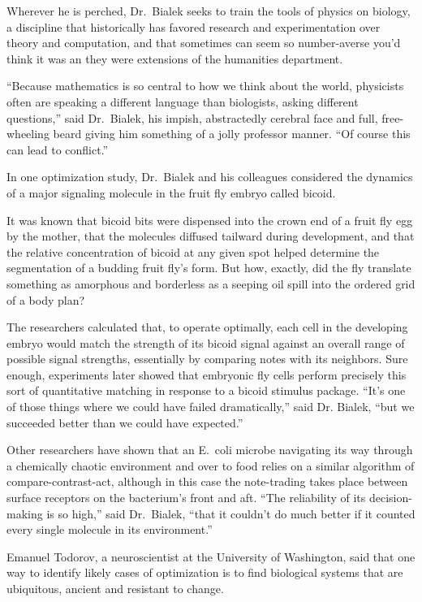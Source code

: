 ﻿\documentclass[12pt]{article}
\begin{document}
Wherever he is perched, Dr.~Bialek seeks to train the tools of physics on biology, a discipline that
historically has favored research and experimentation over theory and computation, and that
sometimes can seem so number-averse you'd think it was an they were extensions of the humanities
department.

``Because mathematics is so central to how we think about the world, physicists often are speaking a
different language than biologists, asking different questions,'' said Dr.~Bialek, his impish,
abstractedly cerebral face and full, free-wheeling beard giving him something of a jolly professor
manner. ``Of course this can lead to conflict.''

In one optimization study, Dr.~Bialek and his colleagues considered the dynamics of a major
signaling molecule in the fruit fly embryo called bicoid.

It was known that bicoid bits were dispensed into the crown end of a fruit fly egg by the mother,
that the molecules diffused tailward during development, and that the relative concentration of
bicoid at any given spot helped determine the segmentation of a budding fruit fly's form. But how,
exactly, did the fly translate something as amorphous and borderless as a seeping oil spill into the
ordered grid of a body plan?

The researchers calculated that, to operate optimally, each cell in the developing embryo would
match the strength of its bicoid signal against an overall range of possible signal strengths,
essentially by comparing notes with its neighbors. Sure enough, experiments later showed that
embryonic fly cells perform precisely this sort of quantitative matching in response to a bicoid
stimulus package. ``It's one of those things where we could have failed dramatically,'' said Dr.
Bialek, ``but we succeeded better than we could have expected.''

Other researchers have shown that an E.~coli microbe navigating its way through a chemically chaotic
environment and over to food relies on a similar algorithm of compare-contrast-act, although in this
case the note-trading takes place between surface receptors on the bacterium's front and aft. ``The
reliability of its decision-making is so high,'' said Dr.~Bialek, ``that it couldn't do much better
if it counted every single molecule in its environment.''

Emanuel Todorov, a neuroscientist at the University of Washington, said that one way to identify
likely cases of optimization is to find biological systems that are ubiquitous, ancient and
resistant to change.
\end{document}
